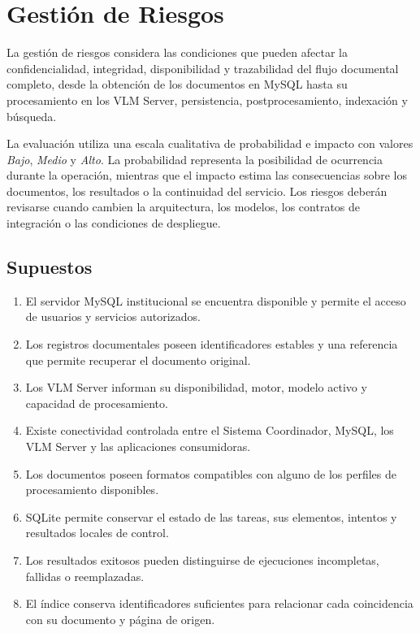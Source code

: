 \section{Gestión de Riesgos}
\label{sec:gestion_riesgos}

La gestión de riesgos considera las condiciones que pueden afectar la confidencialidad, integridad, disponibilidad y trazabilidad del flujo documental completo, desde la obtención de los documentos en MySQL hasta su procesamiento en los VLM Server, persistencia, postprocesamiento, indexación y búsqueda.

La evaluación utiliza una escala cualitativa de probabilidad e impacto con valores \textit{Bajo}, \textit{Medio} y \textit{Alto}. La probabilidad representa la posibilidad de ocurrencia durante la operación, mientras que el impacto estima las consecuencias sobre los documentos, los resultados o la continuidad del servicio. Los riesgos deberán revisarse cuando cambien la arquitectura, los modelos, los contratos de integración o las condiciones de despliegue.

\subsection{Supuestos}
\label{subsec:supuestos}

\begin{enumerate}
    \item El servidor MySQL institucional se encuentra disponible y permite el acceso de usuarios y servicios autorizados.
    \item Los registros documentales poseen identificadores estables y una referencia que permite recuperar el documento original.
    \item Los VLM Server informan su disponibilidad, motor, modelo activo y capacidad de procesamiento.
    \item Existe conectividad controlada entre el Sistema Coordinador, MySQL, los VLM Server y las aplicaciones consumidoras.
    \item Los documentos poseen formatos compatibles con alguno de los perfiles de procesamiento disponibles.
    \item SQLite permite conservar el estado de las tareas, sus elementos, intentos y resultados locales de control.
    \item Los resultados exitosos pueden distinguirse de ejecuciones incompletas, fallidas o reemplazadas.
    \item El índice conserva identificadores suficientes para relacionar cada coincidencia con su documento y página de origen.
\end{enumerate}

